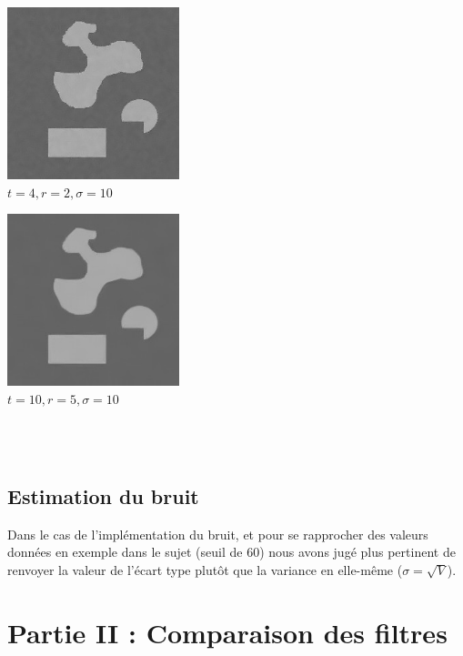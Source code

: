 \documentclass[a4,12pt]{article}
\begin{document}
\noindent
\begin{minipage}[c]{0.50\linewidth}
	\begin{center}
		\includegraphics[width = 50mm]{./img/nltroppetit4-2-10.jpg}\\
		\textit{$t=4, r=2, \sigma=10$}\\
	\end{center}
\end{minipage}
\begin{minipage}[c]{0.50\linewidth}
	\begin{center}
		\includegraphics[width = 50mm]{./img/nlassezgrand10-5-10.jpg}\\
		\textit{$t=10, r=5, \sigma=10$}\\
	\end{center}
\end{minipage}\\
\\
\subsection{Estimation du bruit}
Dans le cas de l'implémentation du bruit, et pour se rapprocher des valeurs données en exemple dans le sujet (seuil de 60) nous avons jugé plus pertinent de renvoyer la valeur de l'écart type plutôt que la variance en elle-même ($\sigma = \sqrt{V}$).


\section{Partie II : Comparaison des filtres}
\end{document}
